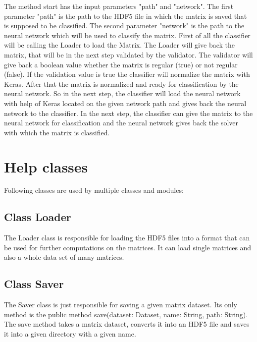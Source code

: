\documentclass[parskip=full]{scrartcl}
\begin{document}
\begin{figure}[h]
\begin{center}

\label{Sequence Diagrams}
\end{center}
\end{figure}

\newpage
The method start has the input parameters "path" and "network".
The first parameter "path" is the path to the \gls{HDF5} file in which the matrix is saved that is supposed to be classified.
The second parameter "network" is the path to the \gls{neural network} which will be used to classify the matrix.
First of all the classifier will be calling the Loader to load the Matrix.
The Loader will give back the matrix, that will be in the next step validated by the validator. 
The validator will give back a boolean value whether the matrix is regular (true) or not regular (false).
If the validation value is true the classifier will normalize the matrix with Keras. 
After that the matrix is normalized and ready for classification by the neural network.
So in the next step, the classifier will load the neural network with help of Keras located on the given network path and gives back the neural network to the classifier.
In the next step, the classifier can give the matrix to the neural network for classification and the neural network gives back the  solver with which the matrix is classified.


\newpage
\section{Help classes}
Following classes are used by multiple classes and modules:

\subsection{Class Loader}
The Loader class is responsible for loading the \gls{HDF5} files into a format that can be used for further computations on the matrices.
It can load single matrices and also a whole data set of many matrices.
\subsection{Class Saver}
The Saver class is just responsible for saving a given matrix dataset.
Its only method is the public method save(dataset: Dataset, name: String, path: String).
The save method takes a matrix dataset, converts it into an \gls{HDF5} file and saves it into a given directory with a given name.
\end{document}

